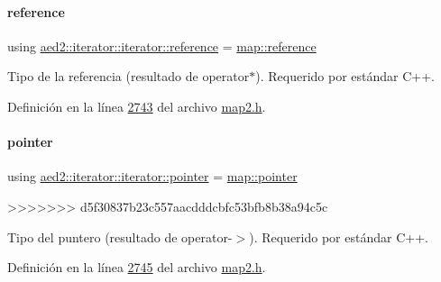 \paragraph{\texorpdfstring{reference}{reference}}
{\footnotesize\ttfamily using \hyperlink{classaed2_1_1iterator_1_1iterator_a91be74b60dfc3eabfa5a69d9aa068959_a91be74b60dfc3eabfa5a69d9aa068959}{aed2\+::iterator\+::iterator\+::reference} =  \hyperlink{classaed2_1_1map_af4f147533b3c0207ab036c86ce13ec0d_af4f147533b3c0207ab036c86ce13ec0d}{map\+::reference}}



Tipo de la referencia (resultado de operator$\ast$). Requerido por estándar C++. 



Definición en la línea \hyperlink{map2_8h_source_l02743}{2743} del archivo \hyperlink{map2_8h_source}{map2.\+h}.

\mbox{\label{classaed2_1_1iterator_1_1iterator_add8c8243f6b0e3cb7b67ce06757df53b_add8c8243f6b0e3cb7b67ce06757df53b}} 
\paragraph{\texorpdfstring{pointer}{pointer}}
{\footnotesize\ttfamily using \hyperlink{classaed2_1_1iterator_1_1iterator_add8c8243f6b0e3cb7b67ce06757df53b_add8c8243f6b0e3cb7b67ce06757df53b}{aed2\+::iterator\+::iterator\+::pointer} =  \hyperlink{classaed2_1_1map_a7394e98a23b86bc008ad73326b273fd5_a7394e98a23b86bc008ad73326b273fd5}{map\+::pointer}}


>>>>>>> d5f30837b23c557aacdddcbfc53bfb8b38a94c5c

Tipo del puntero (resultado de operator-\/$>$). Requerido por estándar C++. 



Definición en la línea \hyperlink{map2_8h_source_l02745}{2745} del archivo \hyperlink{map2_8h_source}{map2.\+h}.

\mbox{\label{classaed2_1_1iterator_1_1iterator_a7dc57879d054ca0168a20003c9d655b6_a7dc57879d054ca0168a20003c9d655b6}} 
